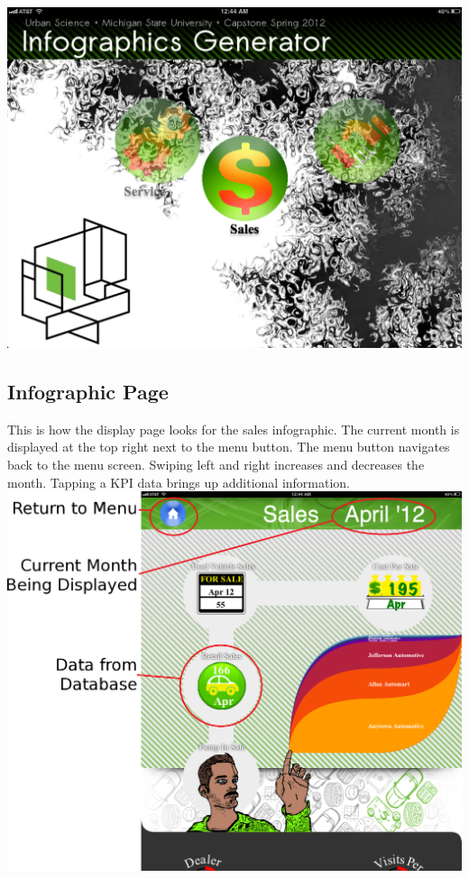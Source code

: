 \documentclass[11pt,a4paper,oneside]{article}
\begin{document}
\includegraphics[width=1\textwidth]{images/main-menu.png}\\
\newpage
\subsection{Infographic Page}

This is how the display page looks for the sales infographic.  The current month is displayed at the top right next to the menu button.  The menu button navigates back to the menu screen.  Swiping left and right increases and decreases the month.  Tapping a KPI data brings up additional information.\\

\includegraphics[width=1\textwidth]{images/labels.png}\\
\end{document}
